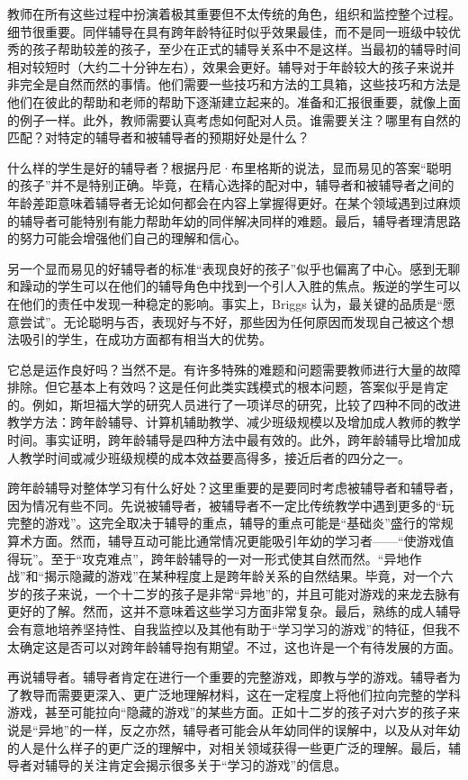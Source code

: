 教师在所有这些过程中扮演着极其重要但不太传统的角色，组织和监控整个过程。细节很重要。同伴辅导在具有跨年龄特征时似乎效果最佳，而不是同一班级中较优秀的孩子帮助较差的孩子，至少在正式的辅导关系中不是这样。当最初的辅导时间相对较短时（大约二十分钟左右），效果会更好。辅导对于年龄较大的孩子来说并非完全是自然而然的事情。他们需要一些技巧和方法的工具箱，这些技巧和方法是他们在彼此的帮助和老师的帮助下逐渐建立起来的。准备和汇报很重要，就像上面的例子一样。此外，教师需要认真考虑如何配对人员。谁需要关注？哪里有自然的匹配？对特定的辅导者和被辅导者的预期好处是什么？

什么样的学生是好的辅导者？根据丹尼·布里格斯的说法，显而易见的答案“聪明的孩子”并不是特别正确。毕竟，在精心选择的配对中，辅导者和被辅导者之间的年龄差距意味着辅导者无论如何都会在内容上掌握得更好。在某个领域遇到过麻烦的辅导者可能特别有能力帮助年幼的同伴解决同样的难题。最后，辅导者理清思路的努力可能会增强他们自己的理解和信心。

另一个显而易见的好辅导者的标准“表现良好的孩子”似乎也偏离了中心。感到无聊和躁动的学生可以在他们的辅导角色中找到一个引人入胜的焦点。叛逆的学生可以在他们的责任中发现一种稳定的影响。事实上，Briggs 认为，最关键的品质是“愿意尝试”。无论聪明与否，表现好与不好，那些因为任何原因而发现自己被这个想法吸引的学生，在成功方面都有相当大的优势。

它总是运作良好吗？当然不是。有许多特殊的难题和问题需要教师进行大量的故障排除。但它基本上有效吗？这是任何此类实践模式的根本问题，答案似乎是肯定的。例如，斯坦福大学的研究人员进行了一项详尽的研究，比较了四种不同的改进教学方法：跨年龄辅导、计算机辅助教学、减少班级规模以及增加成人教师的教学时间。事实证明，跨年龄辅导是四种方法中最有效的。此外，跨年龄辅导比增加成人教学时间或减少班级规模的成本效益要高得多，接近后者的四分之一。

跨年龄辅导对整体学习有什么好处？这里重要的是要同时考虑被辅导者和辅导者，因为情况有些不同。先说被辅导者，被辅导者不一定比传统教学中遇到更多的“玩完整的游戏”。这完全取决于辅导的重点，辅导的重点可能是“基础炎”盛行的常规算术方面。然而，辅导互动可能比通常情况更能吸引年幼的学习者——“使游戏值得玩”。至于“攻克难点”，跨年龄辅导的一对一形式使其自然而然。“异地作战”和“揭示隐藏的游戏”在某种程度上是跨年龄关系的自然结果。毕竟，对一个六岁的孩子来说，一个十二岁的孩子是非常“异地”的，并且可能对游戏的来龙去脉有更好的了解。然而，这并不意味着这些学习方面非常复杂。最后，熟练的成人辅导会有意地培养坚持性、自我监控以及其他有助于“学习学习的游戏”的特征，但我不太确定这是否可以对跨年龄辅导抱有期望。不过，这也许是一个有待发展的方面。

再说辅导者。辅导者肯定在进行一个重要的完整游戏，即教与学的游戏。辅导者为了教导而需要更深入、更广泛地理解材料，这在一定程度上将他们拉向完整的学科游戏，甚至可能拉向“隐藏的游戏”的某些方面。正如十二岁的孩子对六岁的孩子来说是“异地”的一样，反之亦然，辅导者可能会从年幼同伴的误解中，以及从对年幼的人是什么样子的更广泛的理解中，对相关领域获得一些更广泛的理解。最后，辅导者对辅导的关注肯定会揭示很多关于“学习的游戏”的信息。

